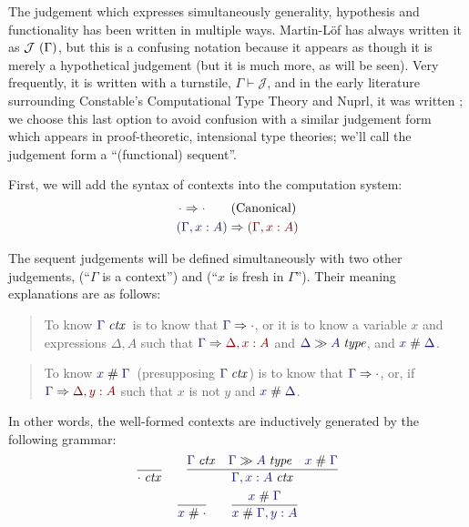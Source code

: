 \documentclass[main.tex]{subfiles}
\begin{document}
The judgement which expresses simultaneously generality, hypothesis and
functionality has been written in multiple ways. Martin-L\"of has always
written it as $\mathcal{J}\ (\Gamma)$, but this is a confusing notation
because it appears as though it is merely a hypothetical judgement (but it is
much more, as will be seen). Very frequently, it is written with a turnstile,
$\Gamma\vdash\mathcal{J}$, and in the early literature surrounding Constable's
Computational Type Theory and Nuprl, it was written
; we choose this last option to avoid
confusion with a similar judgement form which appears in proof-theoretic,
intensional type theories; we'll call the judgement form a ``(functional) sequent''.

First, we will add the syntax of contexts into the computation system:
\begin{gather*}
  \reduce{\cdot}{\cdot}\tag{Canonical}\\
  \reduce{(\Gamma,x:A)}{(\Gamma,x:A)}
\end{gather*}

The sequent judgements will be defined simultaneously with two other
judgements, \framebox{$\isctx{\Gamma}$} (``$\Gamma$ is a context'')
and  (``$x$ is fresh in
$\Gamma$''). Their meaning explanations are as follows:

\begin{quote}
  To know $\isctx\Gamma$\ is to know that $\reduce{\Gamma}{\cdot}$, or it is to know
  a variable $x$ and expressions $\Delta,A$ such that $\reduce{\Gamma}{\Delta, x:A}$
  and $\sequent{\Delta}{\isset{A}}$, and $\fresh{x}{\Delta}$.
\end{quote}

\begin{quote}
  To know $\fresh{x}{\Gamma}$\ (presupposing $\isctx\Gamma$) is to know that
  $\reduce{\Gamma}{\cdot}$, or, if $\reduce{\Gamma}{\Delta,y:A}$
  such that $x$ is not $y$ and $\fresh{x}{\Delta}$.
\end{quote}

In other words, the well-formed contexts are inductively generated by the
following grammar:
\begin{gather*}
  \infer{\isctx\cdot}{}
  \qquad
  \infer{
    \isctx{\Gamma,x:A}
  }{
    \isctx\Gamma &
    \sequent{\Gamma}{\isset{A}} &
    \fresh{x}{\Gamma}
  }\\
  \infer{\fresh{x}{\cdot}}{}
  \qquad
  \infer{
    \fresh{x}{\Gamma,y:A}
  }{
    \fresh{x}{\Gamma}
  }
\end{gather*}
\end{document}
